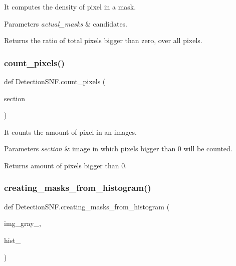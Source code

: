 It computes the density of pixel in a mask. 


\begin{DoxyParams}{Parameters}
{\em actual\+\_\+masks} & candidates. \\
\hline
\end{DoxyParams}
\begin{DoxyReturn}{Returns}
the ratio of total pixels bigger than zero, over all pixels. 
\end{DoxyReturn}
\mbox{\label{namespaceDetectionSNF_a40850a30b587d61f901033e457f6175b}} 
\subsubsection{\texorpdfstring{count\+\_\+pixels()}{count\_pixels()}}
{\footnotesize\ttfamily def Detection\+S\+N\+F.\+count\+\_\+pixels (\begin{DoxyParamCaption}\item[{}]{section }\end{DoxyParamCaption})}



It counts the amount of pixel in an images. 


\begin{DoxyParams}{Parameters}
{\em section} & image in which pixels bigger than 0 will be counted. \\
\hline
\end{DoxyParams}
\begin{DoxyReturn}{Returns}
amount of pixels bigger than 0. 
\end{DoxyReturn}
\mbox{\label{namespaceDetectionSNF_a2bc34b5e9045fd13135f19c5749c0fe7}} 
\subsubsection{\texorpdfstring{creating\+\_\+masks\+\_\+from\+\_\+histogram()}{creating\_masks\_from\_histogram()}}
{\footnotesize\ttfamily def Detection\+S\+N\+F.\+creating\+\_\+masks\+\_\+from\+\_\+histogram (\begin{DoxyParamCaption}\item[{}]{img\+\_\+gray\+\_\+,  }\item[{}]{hist\+\_\+ }\end{DoxyParamCaption})}



